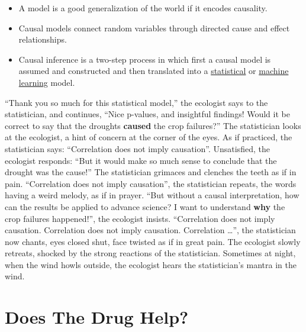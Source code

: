 \documentclass[
  10pt,
]{scrbook}
\providecommand{\tightlist}{%
  \setlength{\itemsep}{0pt}\setlength{\parskip}{0pt}}
\begin{document}
\begin{itemize}
\tightlist
\item
  A model is a good generalization of the world if it encodes causality.
\item
  Causal models connect random variables through directed cause and effect relationships.
\item
  Causal inference is a two-step process in which first a causal model is assumed and constructed and then translated into a \protect\hyperlink{statistical-modeling}{statistical} or \protect\hyperlink{machine-learning}{machine learning} model.
\end{itemize}

``Thank you so much for this statistical model,'' the ecologist says to the statistician, and continues, ``Nice p-values, and insightful findings! Would it be correct to say that the droughts \textbf{caused} the crop failures?''
The statistician looks at the ecologist, a hint of concern at the corner of the eyes.
As if practiced, the statistician says: ``Correlation does not imply causation''.
Unsatisfied, the ecologist responds: ``But it would make so much sense to conclude that the drought was the cause!''
The statistician grimaces and clenches the teeth as if in pain.
``Correlation does not imply causation'', the statistician repeats, the words having a weird melody, as if in prayer.
``But without a causal interpretation, how can the results be applied to advance science? I want to understand \textbf{why} the crop failures happened!'', the ecologist insists.
``Correlation does not imply causation. Correlation does not imply causation. Correlation \ldots{}'', the statistician now chants, eyes closed shut, face twisted as if in great pain.
The ecologist slowly retreats, shocked by the strong reactions of the statistician.
Sometimes at night, when the wind howls outside, the ecologist hears the statistician's mantra in the wind.

\hypertarget{does-the-drug-help}{%
\section{Does The Drug Help?}\label{does-the-drug-help}}
\end{document}
